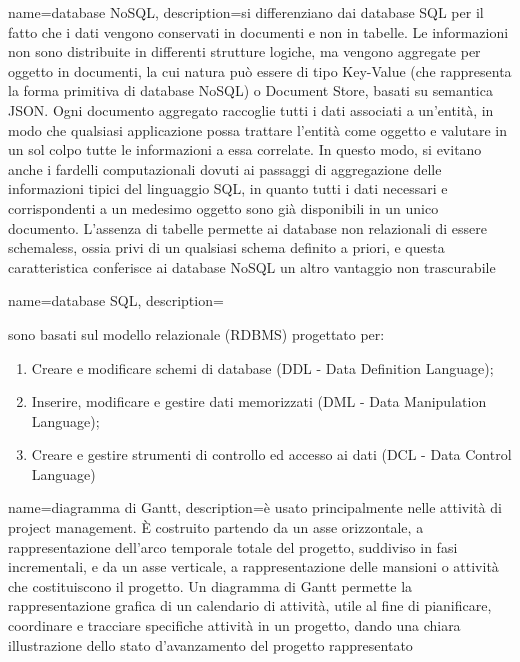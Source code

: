 \hypertarget{D}{}

{
	name=database NoSQL,
	description={si differenziano dai database SQL per il fatto che i dati vengono conservati in documenti e non in tabelle. Le informazioni non sono distribuite in differenti strutture logiche, ma vengono aggregate per oggetto in documenti, la cui natura può essere di tipo Key-Value (che rappresenta la forma primitiva di database NoSQL) o Document Store, basati su semantica JSON. Ogni documento aggregato raccoglie tutti i dati associati a un’entità, in modo che qualsiasi applicazione possa trattare l’entità come oggetto e valutare in un sol colpo tutte le informazioni a essa correlate. In questo modo, si evitano anche i fardelli computazionali dovuti ai passaggi di aggregazione delle informazioni tipici del linguaggio SQL, in quanto tutti i dati necessari e corrispondenti a un medesimo oggetto sono già disponibili in un unico documento. L’assenza di tabelle permette ai database non relazionali di essere schemaless, ossia privi di un qualsiasi schema definito a priori, e questa caratteristica conferisce ai database NoSQL un altro vantaggio non trascurabile}
}

{
	name=database SQL,
	description={sono basati sul modello relazionale (RDBMS) progettato per:
		\begin{enumerate}  
			\item Creare e modificare schemi di database (DDL - Data Definition Language);
			\item Inserire, modificare e gestire dati memorizzati (DML - Data Manipulation Language);
			\item Creare e gestire strumenti di controllo ed accesso ai dati (DCL - Data Control Language)
		\end{enumerate}
	}
}

{
	name=diagramma di Gantt,
	description={è usato principalmente nelle attività di project management. \MakeUppercase{è} costruito partendo da un asse orizzontale, a rappresentazione dell'arco temporale totale del progetto, suddiviso in fasi incrementali, e da un asse verticale, a rappresentazione delle mansioni o attività che costituiscono il progetto. Un diagramma di Gantt permette la rappresentazione grafica di un calendario di attività, utile al fine di pianificare, coordinare e tracciare specifiche attività in un progetto, dando una chiara illustrazione dello stato d'avanzamento del progetto rappresentato}
}

